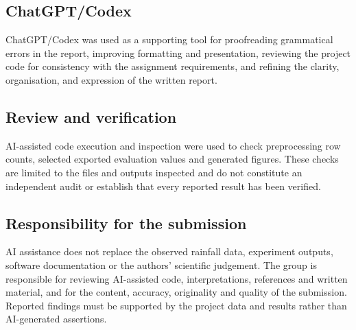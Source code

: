 \documentclass[11pt,a4paper]{article}
\begin{document}
\subsection*{ChatGPT/Codex}
ChatGPT/Codex was used as a supporting tool for proofreading grammatical errors in the
report, improving formatting and presentation, reviewing the project code for consistency with
the assignment requirements, and refining the clarity, organisation, and expression of the written
report.

\subsection*{Review and verification}

AI-assisted code execution and inspection were used to check preprocessing row counts, selected exported evaluation values and generated figures. These checks are limited to the files and outputs inspected and do not constitute an independent audit or establish that every reported result has been verified.

\subsection*{Responsibility for the submission}

AI assistance does not replace the observed rainfall data, experiment outputs, software documentation or the authors' scientific judgement. The group is responsible for reviewing AI-assisted code, interpretations, references and written material, and for the content, accuracy, originality and quality of the submission. Reported findings must be supported by the project data and results rather than AI-generated assertions.


\clearpage





\clearpage


\end{document}
